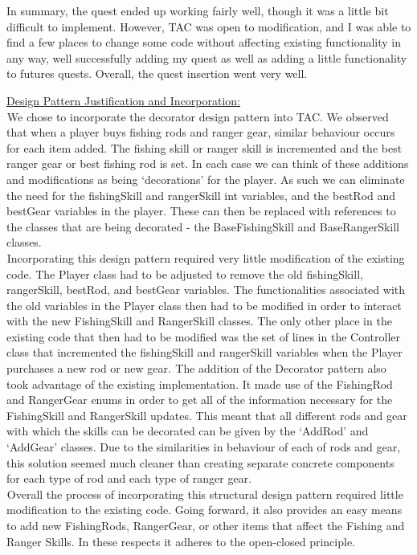 \documentclass[letter paper, 12pt]{article}
\newcommand{\tab}{${}_{}$\hspace{0.2in}}
\newcommand{\noin}{\noindent}
\begin{document}
In summary, the quest ended up working fairly well, though it was a little bit difficult to implement. However, TAC was open to modification, and I was able to find a few places to change some code without affecting existing functionality in any way, well successfully adding my quest as well as adding a little functionality to futures quests. Overall, the quest insertion went very well.\newline

\noin \underline{Design Pattern Justification and Incorporation:}\\\newline
\tab We chose to incorporate the decorator design pattern into TAC. We observed that when a player buys fishing rods and ranger gear, similar behaviour occurs for each item added. The fishing skill or ranger skill is incremented and the best ranger gear or best fishing rod is set. In each case we can think of these additions and modifications as being `decorations' for the player. As such we can eliminate the need for the fishingSkill and rangerSkill int variables, and the bestRod and bestGear variables in the player. These can then be replaced with references to the classes that are being decorated - the BaseFishingSkill and BaseRangerSkill classes. \\
\tab Incorporating this design pattern required very little modification of the existing code. The Player class had to be adjusted to remove the old fishingSkill, rangerSkill, bestRod, and bestGear variables. The functionalities associated with the old variables in the Player class then had to be modified in order to interact with the new FishingSkill and RangerSkill classes. The only other place in the existing code that then had to be modified was the set of lines in the Controller class that incremented the fishingSkill and rangerSkill variables when the Player purchases a new rod or new gear.
\tab The addition of the Decorator pattern also took advantage of the existing implementation. It made use of the FishingRod and RangerGear enums in order to get all of the information necessary for the FishingSkill and RangerSkill updates. This meant that all different rods and gear with which the skills can be decorated can be given by the `AddRod' and `AddGear' classes. Due to the similarities in behaviour of each of rods and gear, this solution seemed much cleaner than creating separate concrete components for each type of rod and each type of ranger gear.\\
\tab Overall the process of incorporating this structural design pattern required little modification to the existing code. Going forward, it also provides an easy means to add new FishingRods, RangerGear, or other items that affect the Fishing and Ranger Skills. In these respects it adheres to the open-closed principle.
\end{document}
